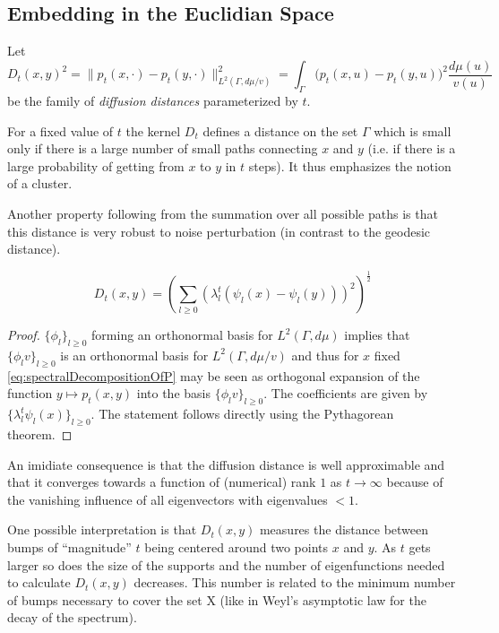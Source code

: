 \subsection{Embedding in the Euclidian Space}
\begin{definition}\label{def:diffusionDist}
Let $$D_t(x,y)^2 =
\|p_t(x, \cdotp) - p_t(y, \cdotp)\|_{L^2(\Gamma, d\mu/v)}^2 =
\int_\Gamma \big(p_t(x, u) - p_t(y, u)\big)^2 \frac{d\mu(u)}{v(u)}$$
be the family of \textit{diffusion distances} parameterized by $t$.
\end{definition}

For a fixed value of $t$ the kernel $D_t$ defines a distance on the set $\Gamma$ which is small only if there is a large number of small paths connecting $x$ and $y$ (i.e. if there is a large probability of getting from $x$ to $y$ in $t$ steps). It thus emphasizes the notion of a cluster.

Another property following from the summation over all possible paths is that this distance is very robust to noise perturbation (in contrast to the geodesic distance).

\begin{theorem}
$$D_t(x,y)=\left(\sum_{l\geq 0} \left(\lambda_l^t(\psi_l(x) - \psi_l(y))\right)^2 \right)^{\frac{1}{2}}$$
\end{theorem}

\begin{proof}
$\{\phi_l\}_{l\geq 0}$ forming an orthonormal basis for $L^2(\Gamma, d\mu)$ implies that $\{\phi_l v\}_{l\geq 0}$ is an orthonormal basis for $L^2(\Gamma, d\mu/v)$ and thus for $x$ fixed \eqref{eq:spectralDecompositionOfP} may be seen as orthogonal expansion of the function $y \mapsto p_t(x,y)$ into the basis $\{\phi_l v\}_{l\geq 0}$.
The coefficients are given by $\{\lambda_l^t \psi_l(x)\}_{l\geq 0}$. The statement follows directly using the Pythagorean theorem.
\end{proof}

An imidiate consequence is that the diffusion distance is well approximable and that it converges towards a function of (numerical) rank $1$ as $t\rightarrow\infty$ because of the vanishing influence of all eigenvectors with eigenvalues $<1$.

One possible interpretation is that $D_t(x,y)$ measures the distance between bumps of ``magnitude'' $t$ being centered around two points $x$ and $y$. As $t$ gets larger so does the size of the supports and the number of eigenfunctions needed to calculate $D_t(x,y)$ decreases. This number is related to the minimum number of bumps necessary to cover the set X (like in Weyl’s asymptotic law for the decay of the spectrum).

